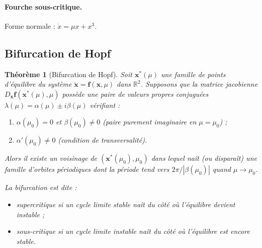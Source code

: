 \documentclass[12pt,a4paper,openany]{book}
\theoremstyle{definition}
\theoremstyle{plain}
\newtheorem{theoreme}[definition]{Théorème}
\theoremstyle{remark}
\newcommand{\R}{\mathbb{R}}
\newcommand{\abs}[1]{\left|#1\right|}
\begin{document}
\paragraph{Fourche sous-critique.}
Forme normale : $\dot{x} = \mu x + x^3$.

\begin{center}
\end{center}

\subsection{Bifurcation de Hopf}
\label{subsec:bif-hopf}

\begin{theoreme}[Bifurcation de Hopf]
\label{thm:hopf}
Soit $\mathbf{x}^*(\mu)$ une famille de points d'équilibre du
système $\dot{\mathbf{x}} = \mathbf{f}(\mathbf{x}, \mu)$ dans
$\R^2$. Supposons que la matrice jacobienne
$D_\mathbf{x}\mathbf{f}(\mathbf{x}^*(\mu), \mu)$ possède une paire
de valeurs propres conjuguées $\lambda(\mu) = \alpha(\mu) \pm i\beta(\mu)$
vérifiant :
\begin{enumerate}[label=(\roman*)]
  \item $\alpha(\mu_0) = 0$ et $\beta(\mu_0) \neq 0$ (paire
        purement imaginaire en $\mu = \mu_0$) ;
  \item $\alpha'(\mu_0) \neq 0$ (condition de transversalité).
\end{enumerate}
Alors il existe un voisinage de $(\mathbf{x}^*(\mu_0), \mu_0)$ dans
lequel naît (ou disparaît) une famille d'orbites périodiques dont la
période tend vers $2\pi/\abs{\beta(\mu_0)}$ quand $\mu \to \mu_0$.

La bifurcation est dite :
\begin{itemize}
  \item \emph{supercritique} si un cycle limite \emph{stable} naît
        du côté où l'équilibre devient instable ;
  \item \emph{sous-critique} si un cycle limite \emph{instable} naît
        du côté où l'équilibre est encore stable.
\end{itemize}
\end{theoreme}
\end{document}

